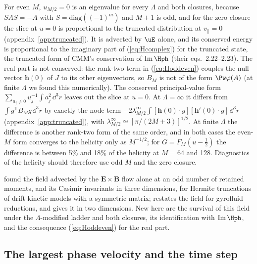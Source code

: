 For even $M$, $u_{M/2}=0$ is an eigenvalue for every $\Lambda$ and both closures, because $SAS=-A$ with $S=\mathrm{diag}((-1)^m)$ and $M+1$ is odd, and for the zero closure the slice at $u=0$ is proportional to the truncated distribution at $v_\parallel=0$ (appendix~\ref{app:truncated}). It is advected by $\uE$ alone, and its conserved energy is proportional to the imaginary part of (\ref{eq:Hcomplex}) for the truncated state, the truncated form of CMM's conservation of $\mathrm{Im}\,\Hph$ (their eqs.~2.22--2.23). The real part is not conserved: the rank-two term in (\ref{eq:Hoddeven}) couples the null vector $\boldsymbol h(0)$ of $J$ to its other eigenvectors, so $B_M$ is not of the form $\Pw\varphi(A)$ (at finite $\Lambda$ we found this numerically). The conserved principal-value form $\sum_{u_j\neq0}u_j^{-1}\int a_j^2\,\dd^3r$ leaves out the slice at $u=0$. At $\Lambda=\infty$ it differs from $\int g^{\mathsf T}B_Mg\,\dd^3r$ by exactly the node term $-2\lambda^\infty_{M/2}\int[\boldsymbol h(0)\cdot g][\boldsymbol h'(0)\cdot g]\,\dd^3r$ (appendix~\ref{app:truncated}), with $\lambda^\infty_{M/2}\simeq[\pi/(2M+3)]^{1/2}$. At finite $\Lambda$ the difference is another rank-two form of the same order, and in both cases the even-$M$ form converges to the helicity only as $M^{-1/2}$; for $G=F_M(u-\frac12)$ the difference is between 5\% and 18\% of the helicity at $M=64$ and 128. Diagnostics of the helicity should therefore use odd $M$ and the zero closure.

\citet{Tassi2022} found the field advected by the $\boldsymbol E\times\boldsymbol B$ flow alone at an odd number of retained moments, and its Casimir invariants in three dimensions, for Hermite truncations of drift-kinetic models with a symmetric matrix; \citet[\S3.4]{Tassi2023} restates the field for gyrofluid reductions, and \citet{Tassi2015} gives it in two dimensions. New here are the survival of this field under the $\Lambda$-modified ladder and both closures, its identification with $\mathrm{Im}\,\Hph$, and the consequence (\ref{eq:Hoddeven}) for the real part.

\subsection{The largest phase velocity and the time step}


